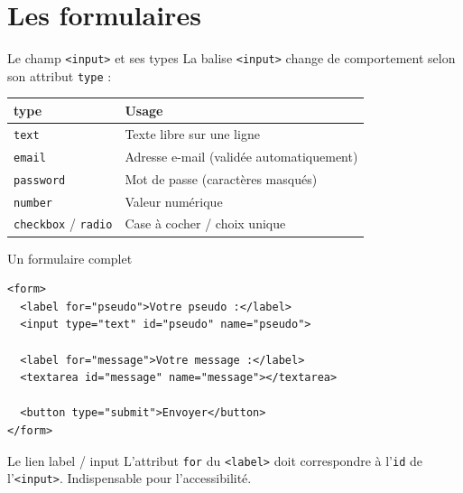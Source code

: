 \documentclass[aspectratio=169,11pt]{beamer}
\begin{document}
\section{Les formulaires}
{
\begin{frame}[plain]
\end{frame}
}

\begin{frame}{Le champ \texttt{<input>} et ses types}
  La balise \texttt{<input>} change de comportement selon son attribut \texttt{type} :
  \vspace{0.2cm}
  \begin{center}
  \renewcommand{\arraystretch}{1.2}
    \begin{tabularx}{\linewidth}{p{3.2cm}X}
    \toprule
    \rowcolor{accentBlue}
    \color{white}\textbf{type} & \color{white}\textbf{Usage} \\
    \midrule
    \rowcolor{cfptGrey}
    \texttt{text} & Texte libre sur une ligne \\
    \texttt{email} & Adresse e-mail (validée automatiquement) \\
    \rowcolor{cfptGrey}
    \texttt{password} & Mot de passe (caractères masqués) \\
    \texttt{number} & Valeur numérique \\
    \rowcolor{cfptGrey}
    \texttt{checkbox} / \texttt{radio} & Case à cocher / choix unique \\
    \bottomrule
  \end{tabularx}
  \end{center}
\end{frame}

\begin{frame}[fragile]{Un formulaire complet}
\begin{lstlisting}[language=HTML5]
<form>
  <label for="pseudo">Votre pseudo :</label>
  <input type="text" id="pseudo" name="pseudo">

  <label for="message">Votre message :</label>
  <textarea id="message" name="message"></textarea>

  <button type="submit">Envoyer</button>
</form>
\end{lstlisting}
  \begin{alertblock}{Le lien label / input}
    L'attribut \texttt{for} du \texttt{<label>} doit correspondre à l'\texttt{id} de l'\texttt{<input>}. Indispensable pour l'accessibilité.
  \end{alertblock}
\end{frame}
\end{document}
